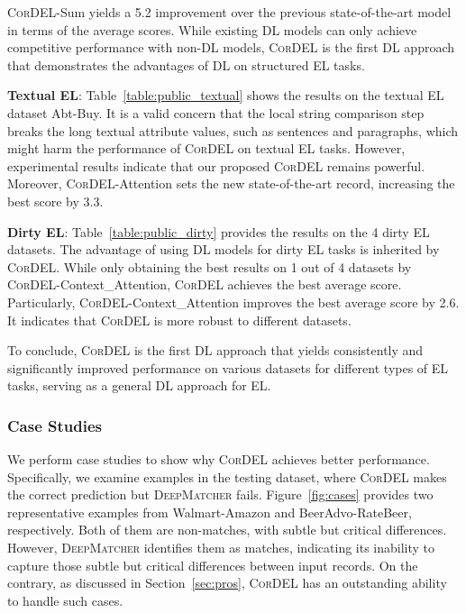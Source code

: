 \documentclass[conference]{IEEEtran}
\begin{document}
\textsc{CorDEL}-Sum yields a 5.2 improvement over the previous state-of-the-art model in terms of the average  scores. While existing DL models can only achieve competitive performance with non-DL models, \textsc{CorDEL} is the first DL approach that demonstrates the advantages of DL on structured EL tasks.
    
\textbf{Textual EL}: Table~\ref{table:public_textual} shows the results on the textual EL dataset Abt-Buy. It is a valid concern that the local string comparison step  breaks the long textual attribute values, such as sentences and paragraphs, which might harm the performance of \textsc{CorDEL} on textual EL tasks. However, experimental results indicate that our proposed \textsc{CorDEL} remains powerful. Moreover, \textsc{CorDEL}-Attention sets the new state-of-the-art record, increasing the best  score by 3.3.
    
\textbf{Dirty EL}: Table~\ref{table:public_dirty} provides the results on the 4 dirty EL datasets. The advantage of using DL models for dirty EL tasks is inherited by \textsc{CorDEL}. While only obtaining the best results on 1 out of 4 datasets by \textsc{CorDEL}-Context\_Attention, \textsc{CorDEL} achieves the best average  score. Particularly, \textsc{CorDEL}-Context\_Attention improves the best average  score by 2.6. It indicates that \textsc{CorDEL} is more robust to different datasets.

To conclude, \textsc{CorDEL} is the first DL approach that yields consistently and significantly improved performance on various datasets for different types of EL tasks, serving as a general DL approach for EL.


\subsubsection{Case Studies}\label{sec:case_study}

We perform case studies to show why \textsc{CorDEL} achieves better performance. Specifically, we examine examples in the testing dataset, where \textsc{CorDEL} makes the correct prediction but \textsc{DeepMatcher} fails. Figure~\ref{fig:cases} provides two representative examples from Walmart-Amazon and BeerAdvo-RateBeer, respectively. Both of them are non-matches, with subtle but critical differences. However, \textsc{DeepMatcher} identifies them as matches, indicating its inability to capture those subtle but critical differences between input records. On the contrary, as discussed in Section~\ref{sec:pros}, \textsc{CorDEL} has an outstanding ability to handle such cases.
\end{document}
